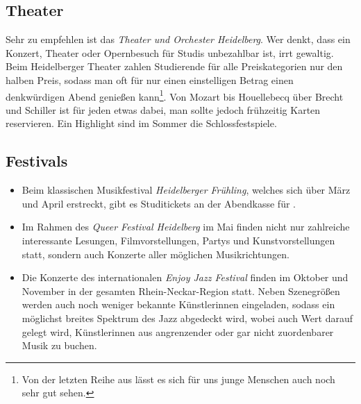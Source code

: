 \subsection{Theater}
Sehr zu empfehlen ist das \emph{Theater und Orchester Heidelberg}. Wer denkt, dass ein Konzert, Theater oder Opernbesuch für Studis unbezahlbar ist, irrt gewaltig. Beim Heidelberger Theater zahlen Studierende für alle Preiskategorien nur den halben Preis, sodass man oft für nur einen einstelligen Betrag einen denkwürdigen Abend genießen kann\footnote{Von der letzten Reihe aus lässt es sich für uns junge Menschen auch noch sehr gut sehen.}. Von Mozart bis Houellebecq über Brecht und Schiller ist für jeden etwas dabei, man sollte jedoch frühzeitig Karten reservieren. Ein Highlight sind im Sommer die Schlossfestspiele.

\subsection{Festivals}

\begin{itemize}
\item Beim klassischen Musikfestival \emph{Heidelberger Frühling}, welches sich über März und April erstreckt, gibt es Studitickets an der Abendkasse für .
\item Im Rahmen des \emph{Queer Festival Heidelberg} im Mai finden nicht nur zahlreiche interessante Lesungen, Filmvorstellungen, Partys und Kunstvorstellungen statt, sondern auch Konzerte aller möglichen Musikrichtungen.
\item Die Konzerte des internationalen \emph{Enjoy Jazz Festival} finden im Oktober und November in der gesamten Rhein-Neckar-Region statt. Neben Szenegrößen werden auch noch weniger bekannte Künstlerinnen eingeladen, sodass ein möglichst breites Spektrum des Jazz abgedeckt wird, wobei auch Wert darauf gelegt wird, Künstlerinnen aus angrenzender oder gar nicht zuordenbarer Musik zu buchen.
\end{itemize}
